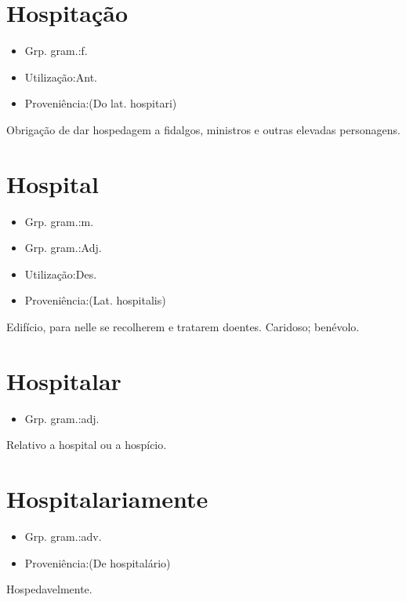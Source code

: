 \documentclass{article}
\begin{document}
\section{Hospitação}
\begin{itemize}
\item {Grp. gram.:f.}
\end{itemize}
\begin{itemize}
\item {Utilização:Ant.}
\end{itemize}
\begin{itemize}
\item {Proveniência:(Do lat. \textunderscore hospitari\textunderscore )}
\end{itemize}
Obrigação de dar hospedagem a fidalgos, ministros e outras elevadas personagens.
\section{Hospital}
\begin{itemize}
\item {Grp. gram.:m.}
\end{itemize}
\begin{itemize}
\item {Grp. gram.:Adj.}
\end{itemize}
\begin{itemize}
\item {Utilização:Des.}
\end{itemize}
\begin{itemize}
\item {Proveniência:(Lat. \textunderscore hospitalis\textunderscore )}
\end{itemize}
Edifício, para nelle se recolherem e tratarem doentes.
Caridoso; benévolo.
\section{Hospitalar}
\begin{itemize}
\item {Grp. gram.:adj.}
\end{itemize}
Relativo a hospital ou a hospício.
\section{Hospitalariamente}
\begin{itemize}
\item {Grp. gram.:adv.}
\end{itemize}
\begin{itemize}
\item {Proveniência:(De \textunderscore hospitalário\textunderscore )}
\end{itemize}
Hospedavelmente.
\end{document}
